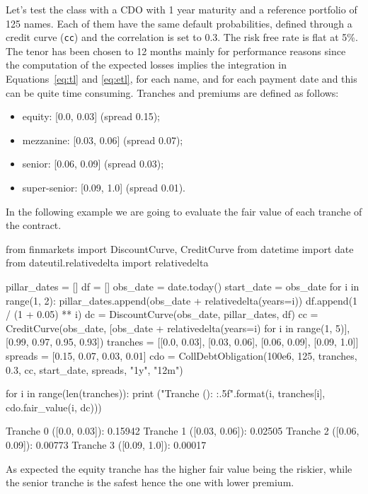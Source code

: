 Let's test the class with a CDO with 1 year maturity and a reference portfolio of 125 names. Each of them have the same default probabilities, defined through a credit curve (\texttt{cc}) and the correlation is set to 0.3. The risk free rate is flat at 5\%. The tenor has been chosen to 12 months mainly for performance reasons since the computation of the expected losses implies the integration in Equations~\ref{eq:tl} and \ref{eq:etl}, for each name, and for each payment date and this can be quite time consuming.
Tranches and premiums are defined as follows:
\begin{itemize}
	\item equity: [0.0, 0.03] (spread 0.15);
	\item mezzanine: [0.03, 0.06] (spread 0.07);
	\item senior: [0.06, 0.09] (spread 0.03);
	\item super-senior: [0.09, 1.0] (spread 0.01).
\end{itemize}

In the following example we are going to evaluate the fair value of each tranche of the contract.

\begin{ipython}
from finmarkets import DiscountCurve, CreditCurve
from datetime import date
from dateutil.relativedelta import relativedelta

pillar_dates = []
df = []
obs_date = date.today()
start_date = obs_date
for i in range(1, 2):
    pillar_dates.append(obs_date + relativedelta(years=i))
    df.append(1 / (1 + 0.05) ** i)
dc = DiscountCurve(obs_date, pillar_dates, df)
cc = CreditCurve(obs_date, 
                 [obs_date + relativedelta(years=i) for i in range(1, 5)],
                 [0.99, 0.97, 0.95, 0.93])
tranches = [[0.0, 0.03], [0.03, 0.06], [0.06, 0.09], [0.09, 1.0]]
spreads = [0.15, 0.07, 0.03, 0.01]
cdo = CollDebtObligation(100e6, 125, tranches, 0.3, cc,
                         start_date, spreads, "1y", "12m")
          
for i in range(len(tranches)):
    print ("Tranche {} ({}): {:.5f}".format(i, tranches[i], cdo.fair_value(i, dc)))
\end{ipython}
\begin{ioutput}
Tranche 0 ([0.0, 0.03]): 0.15942
Tranche 1 ([0.03, 0.06]): 0.02505
Tranche 2 ([0.06, 0.09]): 0.00773
Tranche 3 ([0.09, 1.0]): 0.00017
\end{ioutput}

As expected the equity tranche has the higher fair value being the riskier, while the senior tranche is the safest hence the one with lower premium.

